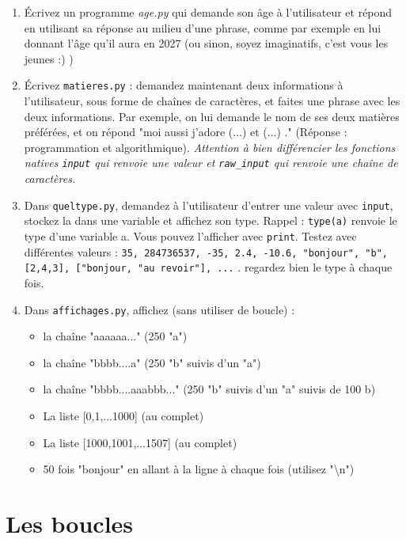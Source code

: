 \documentclass[11pt,a4paper]{article}
\newcommand{\checkbox}{$\square$ \smallskip}
\newcounter{exo} \setcounter{exo}{0}
\newenvironment{action}{%
    \begin{enumerate}[\numerotation] \addtocounter{exo}{-1}%
        }{%
    \end{enumerate}
}
\newcommand{\numexoa}{\theexo \addtocounter{exo}{1}}
\newcommand{\numerotation}{\checkbox \smallskip \numexoa.}
\begin{document}
\begin{action}
\item \'Ecrivez un programme {\it age.py} qui demande son âge à l'utilisateur et répond en utilisant sa réponse au milieu d'une phrase, comme par exemple en lui donnant l'âge qu'il aura en 2027 (ou sinon, soyez imaginatifs, c'est vous les jeunes :) )
\item \'Ecrivez {\tt matieres.py} : demandez maintenant deux informations à l'utilisateur, sous forme de chaînes de caractères, et faites une phrase avec les deux informations. Par exemple, on lui demande le nom de ses deux matières préférées, et on répond "moi aussi j'adore (...) et (...) ."  ({\small Réponse : programmation et algorithmique}). {\it Attention à bien différencier les fonctions natives {\tt input} qui renvoie une {\it valeur} et {\tt raw\_input} qui renvoie une chaîne de caractères.}
\item Dans {\tt queltype.py}, demandez à l'utilisateur d'entrer une valeur avec {\tt input}, stockez la dans une variable et affichez son type. Rappel : {\tt type(a)} renvoie le type d'une variable a. Vous pouvez l'afficher avec {\tt print}. Testez avec différentes valeurs : {\tt 35, 284736537, -35, 2.4, -10.6, "bonjour", "b", [2,4,3], ["bonjour, "au revoir"], ...} . regardez bien le type à chaque fois.

\item Dans {\tt affichages.py}, affichez (sans utiliser de boucle) :
    \begin{itemize}
        \item la chaîne "aaaaaa..." (250 "a")
        \item la chaîne "bbbb....a" (250 "b" suivis d'un "a")
        \item la chaîne "bbbb....aaabbb..." (250 "b" suivis d'un "a" suivis de 100 b)
        \item La liste [0,1,...1000] (au complet)
        \item La liste [1000,1001,...1507] (au complet)
        \item 50 fois "bonjour" en allant à la ligne à chaque fois (utilisez "\textbackslash n")
    \end{itemize}

\end{action}

\newpage
\section{Les boucles}
\end{document}
